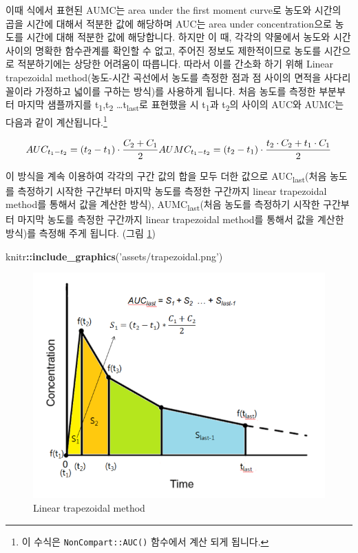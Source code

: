 \documentclass[12pt,]{krantz}
\newenvironment{Shaded}{\begin{snugshade}}{\end{snugshade}}
\newcommand{\KeywordTok}[1]{\textcolor[rgb]{0.13,0.29,0.53}{\textbf{#1}}}
\newcommand{\StringTok}[1]{\textcolor[rgb]{0.31,0.60,0.02}{#1}}
\newcommand{\OperatorTok}[1]{\textcolor[rgb]{0.81,0.36,0.00}{\textbf{#1}}}
\newcommand{\NormalTok}[1]{#1}
\let\rmarkdownfootnote\footnote%
\def\footnote{\protect\rmarkdownfootnote}
\theoremstyle{definition}
\theoremstyle{definition}
\theoremstyle{definition}
\theoremstyle{remark}
\begin{document}
이때 식에서 표현된 AUMC는 area under the first moment curve로 농도와
시간의 곱을 시간에 대해서 적분한 값에 해당하며 AUC는 area under
concentration으로 농도를 시간에 대해 적분한 값에 해당합니다. 하지만 이
때, 각각의 약물에서 농도와 시간 사이의 명확한 함수관계를 확인할 수 없고,
주어진 정보도 제한적이므로 농도를 시간으로 적분하기에는 상당한 어려움이
따릅니다. 따라서 이를 간소화 하기 위해 Linear trapezoidal
method(농도-시간 곡선에서 농도를 측정한 점과 점 사이의 면적을
사다리꼴이라 가정하고 넓이를 구하는 방식)를 사용하게 됩니다. 처음 농도를
측정한 부분부터 마지막 샘플까지를 t\textsubscript{1},t\textsubscript{2}
\ldots{}t\textsubscript{last}로 표현했을 시 t\textsubscript{1}과
t\textsubscript{2}의 사이의 AUC와 AUMC는 다음과 같이
계산됩니다.\footnote{이 수식은 \texttt{NonCompart::AUC()} 함수에서 계산
  되게 됩니다.}

\[
AUC_{t_1-t_2} = 
  (t_2-t_1)\cdot \frac{C_2+C_1}{2} \\
AUMC_{t_1-t_2} = 
  (t_2-t_1)\cdot \frac{t_2 \cdot C_2 + t_1 \cdot C_1}{2}
\]

이 방식을 계속 이용하여 각각의 구간 값의 합을 모두 더한 값으로
AUC\textsubscript{last}(처음 농도를 측정하기 시작한 구간부터 마지막
농도를 측정한 구간까지 linear trapezoidal method를 통해서 값을 계산한
방식), AUMC\textsubscript{last}(처음 농도를 측정하기 시작한 구간부터
마지막 농도를 측정한 구간까지 linear trapezoidal method를 통해서 값을
계산한 방식)를 측정해 주게 됩니다. (그림 \ref{fig:trapezoid})

\begin{Shaded}
\begin{Highlighting}[]
\NormalTok{knitr}\OperatorTok{::}\KeywordTok{include_graphics}\NormalTok{(}\StringTok{'assets/trapezoidal.png'}\NormalTok{)}
\end{Highlighting}
\end{Shaded}

\begin{figure}
\includegraphics[width=1\linewidth]{assets/trapezoidal} \caption{Linear trapezoidal method}\label{fig:trapezoid}
\end{figure}
\end{document}

